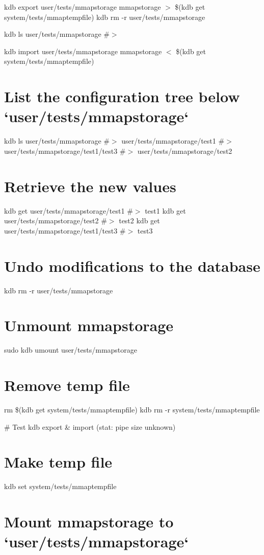 kdb export user/tests/mmapstorage mmapstorage $>$ \$(kdb get system/tests/mmaptempfile) kdb rm -\/r user/tests/mmapstorage

kdb ls user/tests/mmapstorage \#$>$

kdb import user/tests/mmapstorage mmapstorage $<$ \$(kdb get system/tests/mmaptempfile)\hypertarget{autotoc_md444_autotoc_md451}{}\section{List the configuration tree below `user/tests/mmapstorage`}\label{autotoc_md444_autotoc_md451}
kdb ls user/tests/mmapstorage \#$>$ user/tests/mmapstorage/test1 \#$>$ user/tests/mmapstorage/test1/test3 \#$>$ user/tests/mmapstorage/test2\hypertarget{autotoc_md444_autotoc_md452}{}\section{Retrieve the new values}\label{autotoc_md444_autotoc_md452}
kdb get user/tests/mmapstorage/test1 \#$>$ test1 kdb get user/tests/mmapstorage/test2 \#$>$ test2 kdb get user/tests/mmapstorage/test1/test3 \#$>$ test3\hypertarget{autotoc_md444_autotoc_md453}{}\section{Undo modifications to the database}\label{autotoc_md444_autotoc_md453}
kdb rm -\/r user/tests/mmapstorage\hypertarget{autotoc_md444_autotoc_md454}{}\section{Unmount mmapstorage}\label{autotoc_md444_autotoc_md454}
sudo kdb umount user/tests/mmapstorage\hypertarget{autotoc_md444_autotoc_md455}{}\section{Remove temp file}\label{autotoc_md444_autotoc_md455}
rm \$(kdb get system/tests/mmaptempfile) kdb rm -\/r system/tests/mmaptempfile 
\begin{DoxyCode}
# Test kdb export & import (stat: pipe size unknown)
\end{DoxyCode}
 \hypertarget{autotoc_md444_autotoc_md456}{}\section{Make temp file}\label{autotoc_md444_autotoc_md456}
kdb set system/tests/mmaptempfile \hypertarget{autotoc_md444_autotoc_md457}{}\section{Mount mmapstorage to `user/tests/mmapstorage`}\label{autotoc_md444_autotoc_md457}

